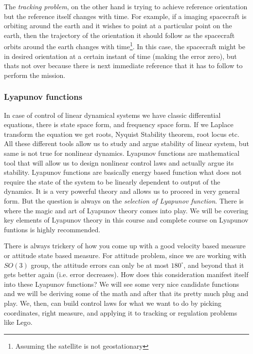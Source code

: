 \documentclass{article}
\begin{document}
The \textit{tracking problem}, on the other hand is trying to achieve reference orientation but the reference itself changes with time. For example, if a imaging spacecraft is orbiting around the earth and it wishes to point at a particular point on the earth, then the trajectory of the orientation it should follow as the spacecraft orbits around the earth changes with time\footnote{Assuming the satellite is not geostationary}. In this case, the spacecraft might be in desired orientation at a certain instant of time (making the error zero), but thats not over because there is next immediate reference that it has to follow to perform the mission.

\subsubsection*{Lyapunov functions}
In case of control of linear dynamical systems we have classic differential equations, there is state space form, and frequency space form. If we Laplace transform the equation we get roots, Nyquist Stability theorem, root locus etc. All these different tools allow us to study and argue stability of linear system, but same is not true for nonlinear dynamics. Lyapunov functions are mathematical tool that will allow us to design nonlinear control laws and actually argue its stability. Lyapunov functions are basically energy based function what does not require the state of  the system to be linearly dependent to output of the dynamics. It is a very powerful theory and allows us to proceed in very general form. But the question is always on the \textit{selection of Lyapunov function}. There is where the magic and art of Lyapunov theory comes into play. We will be covering key elements of Lyapunov theory in this course and complete course on Lyapunov funtions is highly recommended.

There is always trickery of how you come up with a good velocity based measure or attitude state based measure. For attitude problem, since we are working with $SO(3)$ group, the attitude errors can only be at most $180^\circ$, and beyond that it gets better again (i.e. error decreases). How does this consideration manifest itself into these Lyapunov functions? We will see some very nice candidate functions and we will be deriving some of the math and after that its pretty much plug and play. We, then, can build control laws for what we want to do by picking coordinates, right measure, and applying it to tracking or regulation problems like Lego.
\end{document}
